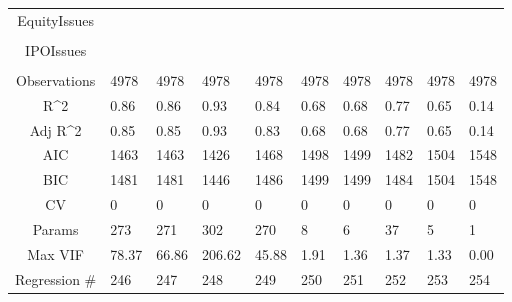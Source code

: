\documentclass{article}
\begin{document}
\begin{table}[H]
\begin{tabular}{|clllllllll|}
  EquityIssues &  &  &  &  &  &  &  &  &  \\ 
   &  &  &  &  &  &  &  &  &  \\ 
  IPOIssues &  &  &  &  &  &  &  &  &  \\ 
   &  &  &  &  &  &  &  &  &  \\ 
  \hline 
 Observations & 4978 & 4978 & 4978 & 4978 & 4978 & 4978 & 4978 & 4978 & 4978 \\ 
  R^2 & 0.86 & 0.86 & 0.93 & 0.84 & 0.68 & 0.68 & 0.77 & 0.65 & 0.14 \\ 
  Adj R^2 & 0.85 & 0.85 & 0.93 & 0.83 & 0.68 & 0.68 & 0.77 & 0.65 & 0.14 \\ 
  AIC & 1463 & 1463 & 1426 & 1468 & 1498 & 1499 & 1482 & 1504 & 1548 \\ 
  BIC & 1481 & 1481 & 1446 & 1486 & 1499 & 1499 & 1484 & 1504 & 1548 \\ 
  CV & 0 & 0 & 0 & 0 & 0 & 0 & 0 & 0 & 0 \\ 
  Params & 273 & 271 & 302 & 270 & 8 & 6 & 37 & 5 & 1 \\ 
  Max VIF & 78.37 & 66.86 & 206.62 & 45.88 & 1.91 & 1.36 & 1.37 & 1.33 & 0.00 \\ 
  Regression \# & 246 & 247 & 248 & 249 & 250 & 251 & 252 & 253 & 254 \\ 
   \hline
\end{tabular}
 
\end{table}
\end{document}
